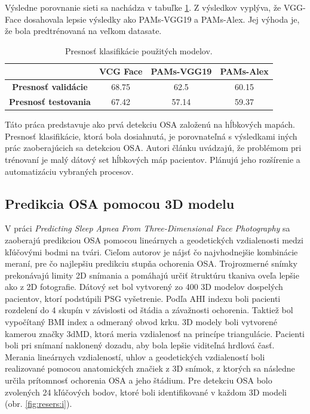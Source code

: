 Výsledne porovnanie sieti sa nachádza v tabuľke \ref{tab:resers:2}. Z výsledkov vyplýva, že VGG-Face dosahovala lepsie výsledky ako PAMs-VGG19 a PAMs-Alex. Jej výhoda je, že bola predtrénovaná na veľkom datasate. 

\begin{table}[H]
	\caption{\label{tab:resers:2} Presnosť klasifikácie použitých modelov. }
	\centering
	\begin{tabular}{cccc}
		\toprule
		\textbf{} & \textbf{VCG Face} & \textbf{PAMs-VGG19} & \textbf{PAMs-Alex}     \\ 
		\midrule
		\textbf{Presnosť validácie}		& 68.75		& 62.5		& 60.15		\\ 
		\textbf{Presnosť testovania}	& 67.42		& 57.14  	& 59.37		\\ 
		\bottomrule
	\end{tabular}
\end{table}

Táto práca predstavuje ako prvá detekciu OSA založenú na hĺbkových mapách. Presnosť klasifikácie, ktorá bola dosiahnutá, je porovnateľná s výsledkami iných prác zaoberajúcich sa detekciou OSA. Autori článku uvádzajú, že problémom pri trénovaní je malý dátový set hĺbkových máp pacientov. Plánujú jeho rozšírenie a automatizáciu vybraných procesov. 

\subsection{Predikcia OSA pomocou 3D modelu}

V práci \textit{Predicting Sleep Apnea From Three-Dimensional Face Photography} sa zaoberajú predikciou OSA pomocou lineárnych a geodetických vzdialenosti medzi kľúčovými bodmi na tvári. Cieľom autorov je nájsť čo najvhodnejšie kombinácie meraní, pre čo najlepšiu predikciu stupňa ochorenia OSA. 
Trojrozmerné snímky prekonávajú limity 2D snímania a pomáhajú určiť štruktúru tkaniva oveľa lepšie ako z 2D fotografie. Dátový set bol vytvorený zo 400 3D modelov dospelých pacientov, ktorí podstúpili PSG vyšetrenie. Podľa AHI indexu boli pacienti rozdelení do 4 skupín v závislosti od štádia a závažnosti ochorenia. Taktiež bol vypočítaný BMI index a odmeraný obvod krku. 3D modely boli vytvorené kamerou značky 3dMD, ktorá meria vzdialenosť na princípe triangulácie. Pacienti boli pri snímaní naklonený dozadu, aby bola lepšie viditeľná hrdlová časť. Merania lineárnych vzdialeností, uhlov a geodetických vzdialeností boli realizované pomocou anatomických značiek z 3D snímok, z ktorých sa následne určila prítomnosť ochorenia OSA a jeho štádium. Pre detekciu OSA bolo zvolených 24 kľúčových bodov, ktoré boli identifikované v každom 3D modeli (obr. \ref{fig:resers:i}). 


